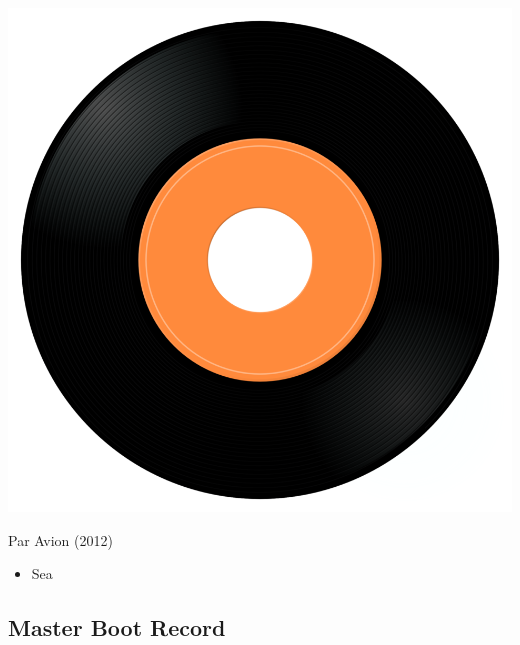 \begin{minipage}[t]{0.25\textwidth}
\captionsetup{type=figure}
\includegraphics[width=\textwidth]{Images/cover.png}
\caption*{Par Avion (2012)}
\end{minipage}
\begin{minipage}[t]{0.25\textwidth}\vspace{0pt}
\begin{itemize}[nosep,leftmargin=1em,labelwidth=*,align=left]
	\setlength{\itemsep}{0pt}
	\item Sea
\end{itemize}
\end{minipage}

\subsection{Master Boot Record}

